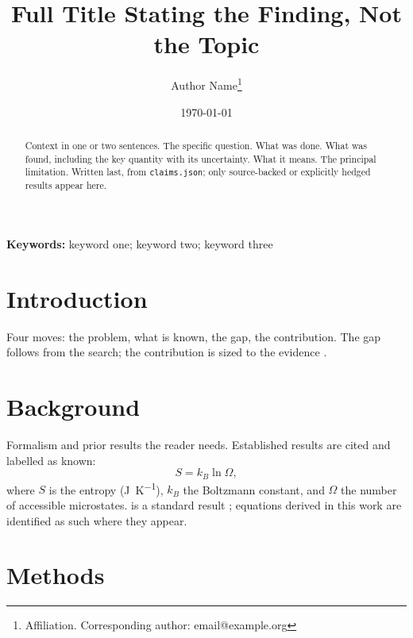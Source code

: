 \documentclass[11pt,a4paper]{article}
\begin{document}
\title{\bfseries Full Title Stating the Finding, Not the Topic}
\author{Author Name\thanks{Affiliation. Corresponding author: email@example.org}}
\date{\today}
\maketitle

\begin{abstract}
\noindent
Context in one or two sentences. The specific question. What was done. What was
found, including the key quantity with its uncertainty. What it means. The
principal limitation. Written last, from \texttt{claims.json}; only
source-backed or explicitly hedged results appear here.
\end{abstract}

\vspace{0.5em}
\noindent\textbf{Keywords:} keyword one; keyword two; keyword three

\section{Introduction}
\label{sec:intro}

Four moves: the problem, what is known, the gap, the contribution. The gap
follows from the search; the contribution is sized to the evidence
\citep{example2024}.

\section{Background}
\label{sec:background}

Formalism and prior results the reader needs. Established results are cited and
labelled as known:
\begin{equation}
  S = k_B \ln \Omega ,
  \label{eq:boltzmann}
\end{equation}
where $S$ is the entropy (\si{\joule\per\kelvin}), $k_B$ the Boltzmann constant,
and $\Omega$ the number of accessible microstates.  is a
standard result \citep{example2024}; equations derived in this work are
identified as such where they appear.

\section{Methods}
\label{sec:methods}
\end{document}
